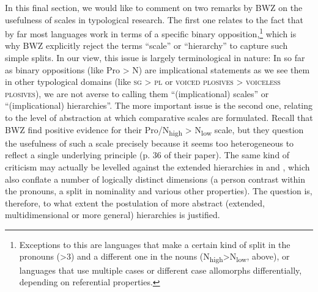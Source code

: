 \documentclass[output=paper]{langscibook}
\begin{document}
In this final section, we would like to comment on two remarks by BWZ on the usefulness of scales in typological research. The first one relates to the fact that by far most languages work in terms of a specific binary opposition,\footnote{Exceptions to this are languages that make a certain kind of split in the pronouns (>3) and a different one in the nouns (\eg N\textsubscript{high}>N\textsubscript{low}, \cf {} above), or languages that use multiple cases or different case allomorphs differentially, depending on referential properties.} which is why BWZ explicitly reject the terms “scale” or “hierarchy” to capture such simple splits. In our view, this issue is largely terminological in nature: In so far as binary oppositions (like Pro > N) are implicational statements as we see them in other typological domains (\eg like \textsc{sg > pl} or \textsc{voiced plosives > voiceless plosives}), we are not averse to calling them “(implicational) scales” or “(implicational) hierarchies”. The more important issue is the second one, relating to the level of abstraction at which comparative scales are formulated. Recall that BWZ find positive evidence for their Pro/N\textsubscript{high} > N\textsubscript{low} scale, but they question the usefulness of such a scale precisely because it seems too heterogeneous to reflect a single underlying principle (p. 36 of their paper). The same kind of criticism may actually be levelled against the extended hierarchies in  and , which also conflate a number of logically distinct dimensions (\eg a person contrast within the pronouns, a split in nominality and various other properties). The question is, therefore, to what extent the postulation of more abstract (\ie extended, multidimensional or more general) hierarchies is justified.  
\end{document}

